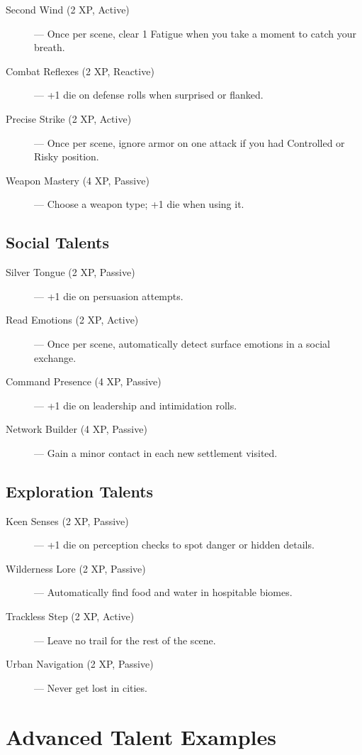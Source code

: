 \documentclass[11pt,twoside,openany]{book}
\begin{document}
\begin{description}
\item[Second Wind (2 XP, Active)] — Once per scene, clear 1 Fatigue when you take a moment to catch your breath.
\item[Combat Reflexes (2 XP, Reactive)] — +1 die on defense rolls when surprised or flanked.
\item[Precise Strike (2 XP, Active)] — Once per scene, ignore armor on one attack if you had Controlled or Risky position.
\item[Weapon Mastery (4 XP, Passive)] — Choose a weapon type; +1 die when using it.
\end{description}

\subsection*{Social Talents}

\begin{description}
\item[Silver Tongue (2 XP, Passive)] — +1 die on persuasion attempts.
\item[Read Emotions (2 XP, Active)] — Once per scene, automatically detect surface emotions in a social exchange.
\item[Command Presence (4 XP, Passive)] — +1 die on leadership and intimidation rolls.
\item[Network Builder (4 XP, Passive)] — Gain a minor contact in each new settlement visited.
\end{description}

\subsection*{Exploration Talents}

\begin{description}
\item[Keen Senses (2 XP, Passive)] — +1 die on perception checks to spot danger or hidden details.
\item[Wilderness Lore (2 XP, Passive)] — Automatically find food and water in hospitable biomes.
\item[Trackless Step (2 XP, Active)] — Leave no trail for the rest of the scene.
\item[Urban Navigation (2 XP, Passive)] — Never get lost in cities.
\end{description}

\section*{Advanced Talent Examples} 
\end{document}
